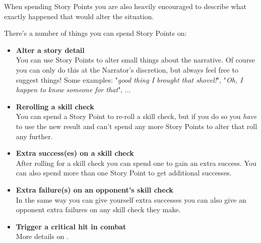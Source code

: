 When spending Story Points you are also heavily encouraged to describe what exactly happened that would alter the situation. 

There's a number of things you can spend Story Points on:

\begin{itemize}[topsep=0pt]

    \item \textbf{Alter a story detail}\\
    You can use Story Points to alter small things about the narrative. 
    Of course you can only do this at the Narrator's discretion, but always feel free to suggest things!
    Some examples: "\textit{good thing I brought that shovel!}", "\textit{Oh, I happen to know someone for that}", ...

    \item \textbf{Rerolling a skill check}\\
    You can spend a Story Point to re-roll a skill check, 
    but if you do so you \textit{have} to use the new result and can't spend any more Story Points to alter that roll any further.

    \item \textbf{Extra success(es) on a skill check}\\
    After rolling for a skill check you can spend one to gain an extra success.
    You can also spend more than one Story Point to get additional successes.

    \item \textbf{Extra failure(s) on an opponent's skill check}\\
    In the same way you can give yourself extra successes you can also give an opponent extra failures on any skill check they make.

    \item \textbf{Trigger a critical hit in combat}\\
    More details on .


\end{itemize}

